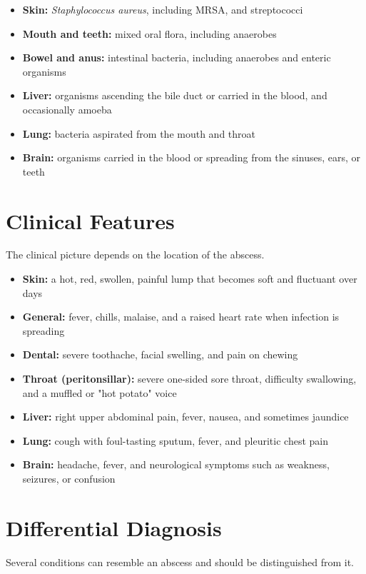 \begin{itemize}
    \item \textbf{Skin:} \textit{Staphylococcus aureus}, including MRSA, and streptococci
    \item \textbf{Mouth and teeth:} mixed oral flora, including anaerobes
    \item \textbf{Bowel and anus:} intestinal bacteria, including anaerobes and enteric organisms
    \item \textbf{Liver:} organisms ascending the bile duct or carried in the blood, and occasionally amoeba
    \item \textbf{Lung:} bacteria aspirated from the mouth and throat
    \item \textbf{Brain:} organisms carried in the blood or spreading from the sinuses, ears, or teeth
\end{itemize}

\section*{Clinical Features}
The clinical picture depends on the location of the abscess.

\begin{itemize}
    \item \textbf{Skin:} a hot, red, swollen, painful lump that becomes soft and fluctuant over days
    \item \textbf{General:} fever, chills, malaise, and a raised heart rate when infection is spreading
    \item \textbf{Dental:} severe toothache, facial swelling, and pain on chewing
    \item \textbf{Throat (peritonsillar):} severe one-sided sore throat, difficulty swallowing, and a muffled or "hot potato" voice
    \item \textbf{Liver:} right upper abdominal pain, fever, nausea, and sometimes jaundice
    \item \textbf{Lung:} cough with foul-tasting sputum, fever, and pleuritic chest pain
    \item \textbf{Brain:} headache, fever, and neurological symptoms such as weakness, seizures, or confusion
\end{itemize}

\section*{Differential Diagnosis}
Several conditions can resemble an abscess and should be distinguished from it.

